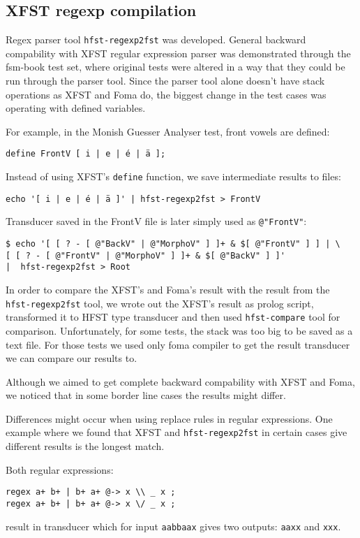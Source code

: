 \documentclass{llncs}
\begin{document}
\subsection{XFST regexp compilation}

Regex parser tool \verb+hfst-regexp2fst+ was developed. General backward
compability with XFST regular expression parser was demonstrated through the
fsm-book test set, where original tests were altered in a way that they could be
run through the parser tool. Since the parser tool alone doesn't have stack
operations as XFST and Foma do, the biggest change in the test cases was
operating with defined variables.

For example, in the Monish Guesser Analyser test, front vowels are defined:
\begin{verbatim}
define FrontV [ i | e | é | ä ];
\end{verbatim}  
Instead of using XFST's \verb+define+ function, we save intermediate results
to files:
\begin{verbatim}
echo '[ i | e | é | ä ]' | hfst-regexp2fst > FrontV
\end{verbatim}  
Transducer saved in the FrontV file is later simply used as \verb+@"FrontV"+:
\begin{verbatim}
$ echo '[ [ ? - [ @"BackV" | @"MorphoV" ] ]+ & $[ @"FrontV" ] ] | \
[ [ ? - [ @"FrontV" | @"MorphoV" ] ]+ & $[ @"BackV" ] ]'
|  hfst-regexp2fst > Root
\end{verbatim}

In order to compare the XFST's and Foma's result with the result from the
\verb+hfst-regexp2fst+ tool, we wrote out the XFST's result as prolog script,
transformed it to HFST type transducer and then used \verb+hfst-compare+ tool
for comparison. Unfortunately, for some tests, the stack was too big to be saved
as a text file. For those tests we used only foma compiler to get the result
transducer we can compare our results to.

Although we aimed to get complete backward compability with XFST and Foma, we
noticed that in some border line cases the results might differ.

Differences might occur when using replace rules in regular expressions.
One example where we found that XFST and \verb+hfst-regexp2fst+ in certain cases
give different results is the longest match.

Both regular expressions: 
\begin{verbatim}
regex a+ b+ | b+ a+ @-> x \\ _ x ;
regex a+ b+ | b+ a+ @-> x \/ _ x ;
\end{verbatim}
result in transducer which for input \verb+aabbaax+ gives two outputs:
\verb+aaxx+ and \verb+xxx+.
\end{document}
